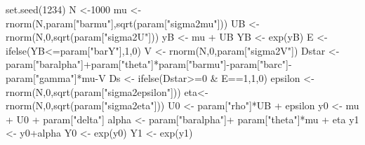 \documentclass[
]{book}
\newenvironment{Shaded}{\begin{snugshade}}{\end{snugshade}}
\newcommand{\DecValTok}[1]{\textcolor[rgb]{0.00,0.00,0.81}{#1}}
\newcommand{\FunctionTok}[1]{\textcolor[rgb]{0.00,0.00,0.00}{#1}}
\newcommand{\NormalTok}[1]{#1}
\newcommand{\OtherTok}[1]{\textcolor[rgb]{0.56,0.35,0.01}{#1}}
\newcommand{\SpecialCharTok}[1]{\textcolor[rgb]{0.00,0.00,0.00}{#1}}
\newcommand{\StringTok}[1]{\textcolor[rgb]{0.31,0.60,0.02}{#1}}
\theoremstyle{definition}
\theoremstyle{definition}
\theoremstyle{definition}
\theoremstyle{definition}
\theoremstyle{remark}
\begin{document}
\begin{Shaded}
\begin{Highlighting}[]
\FunctionTok{set.seed}\NormalTok{(}\DecValTok{1234}\NormalTok{)}
\NormalTok{N }\OtherTok{\textless{}{-}}\DecValTok{1000}
\NormalTok{mu }\OtherTok{\textless{}{-}} \FunctionTok{rnorm}\NormalTok{(N,param[}\StringTok{"barmu"}\NormalTok{],}\FunctionTok{sqrt}\NormalTok{(param[}\StringTok{"sigma2mu"}\NormalTok{]))}
\NormalTok{UB }\OtherTok{\textless{}{-}} \FunctionTok{rnorm}\NormalTok{(N,}\DecValTok{0}\NormalTok{,}\FunctionTok{sqrt}\NormalTok{(param[}\StringTok{"sigma2U"}\NormalTok{]))}
\NormalTok{yB }\OtherTok{\textless{}{-}}\NormalTok{ mu }\SpecialCharTok{+}\NormalTok{ UB }
\NormalTok{YB }\OtherTok{\textless{}{-}} \FunctionTok{exp}\NormalTok{(yB)}
\NormalTok{E }\OtherTok{\textless{}{-}} \FunctionTok{ifelse}\NormalTok{(YB}\SpecialCharTok{\textless{}=}\NormalTok{param[}\StringTok{"barY"}\NormalTok{],}\DecValTok{1}\NormalTok{,}\DecValTok{0}\NormalTok{)}
\NormalTok{V }\OtherTok{\textless{}{-}} \FunctionTok{rnorm}\NormalTok{(N,}\DecValTok{0}\NormalTok{,param[}\StringTok{"sigma2V"}\NormalTok{])}
\NormalTok{Dstar }\OtherTok{\textless{}{-}}\NormalTok{ param[}\StringTok{"baralpha"}\NormalTok{]}\SpecialCharTok{+}\NormalTok{param[}\StringTok{"theta"}\NormalTok{]}\SpecialCharTok{*}\NormalTok{param[}\StringTok{"barmu"}\NormalTok{]}\SpecialCharTok{{-}}\NormalTok{param[}\StringTok{"barc"}\NormalTok{]}\SpecialCharTok{{-}}\NormalTok{param[}\StringTok{"gamma"}\NormalTok{]}\SpecialCharTok{*}\NormalTok{mu}\SpecialCharTok{{-}}\NormalTok{V}
\NormalTok{Ds }\OtherTok{\textless{}{-}} \FunctionTok{ifelse}\NormalTok{(Dstar}\SpecialCharTok{\textgreater{}=}\DecValTok{0} \SpecialCharTok{\&}\NormalTok{ E}\SpecialCharTok{==}\DecValTok{1}\NormalTok{,}\DecValTok{1}\NormalTok{,}\DecValTok{0}\NormalTok{)}
\NormalTok{epsilon }\OtherTok{\textless{}{-}} \FunctionTok{rnorm}\NormalTok{(N,}\DecValTok{0}\NormalTok{,}\FunctionTok{sqrt}\NormalTok{(param[}\StringTok{"sigma2epsilon"}\NormalTok{]))}
\NormalTok{eta}\OtherTok{\textless{}{-}} \FunctionTok{rnorm}\NormalTok{(N,}\DecValTok{0}\NormalTok{,}\FunctionTok{sqrt}\NormalTok{(param[}\StringTok{"sigma2eta"}\NormalTok{]))}
\NormalTok{U0 }\OtherTok{\textless{}{-}}\NormalTok{ param[}\StringTok{"rho"}\NormalTok{]}\SpecialCharTok{*}\NormalTok{UB }\SpecialCharTok{+}\NormalTok{ epsilon}
\NormalTok{y0 }\OtherTok{\textless{}{-}}\NormalTok{ mu }\SpecialCharTok{+}\NormalTok{  U0 }\SpecialCharTok{+}\NormalTok{ param[}\StringTok{"delta"}\NormalTok{]}
\NormalTok{alpha }\OtherTok{\textless{}{-}}\NormalTok{ param[}\StringTok{"baralpha"}\NormalTok{]}\SpecialCharTok{+}\NormalTok{  param[}\StringTok{"theta"}\NormalTok{]}\SpecialCharTok{*}\NormalTok{mu }\SpecialCharTok{+}\NormalTok{ eta}
\NormalTok{y1 }\OtherTok{\textless{}{-}}\NormalTok{ y0}\SpecialCharTok{+}\NormalTok{alpha}
\NormalTok{Y0 }\OtherTok{\textless{}{-}} \FunctionTok{exp}\NormalTok{(y0)}
\NormalTok{Y1 }\OtherTok{\textless{}{-}} \FunctionTok{exp}\NormalTok{(y1)}
\end{Highlighting}
\end{Shaded}
\end{document}
